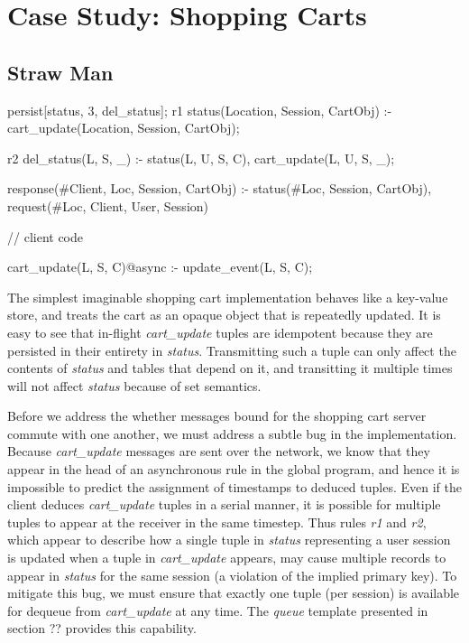\section{Case Study: Shopping Carts}


\subsection{Straw Man}

\begin{Dedalus}
persist[status, 3, del_status];
r1
status(Location, Session, CartObj) :-
    cart_update(Location,  Session, CartObj);
    
r2
del_status(L, S, _) :-
    status(L, U, S, C),
    cart_update(L, U, S, _);

response(#Client, Loc, Session, CartObj) :-
    status(#Loc, Session, CartObj),
    request(#Loc, Client, User, Session)

// client code

cart_update(L, S, C)@async :- update_event(L, S, C);

\end{Dedalus}

The simplest imaginable shopping cart implementation behaves like a key-value store,
and treats the cart as an opaque object that is repeatedly updated.  It is easy to see that
in-flight {\em cart\_update} tuples are idempotent because they are persisted in their entirety
in {\em status}.  Transmitting such a tuple can only affect the contents of {\em status} and tables that depend on it, and transitting it multiple times will not affect {\em status} because of set
semantics.

Before we address the whether messages bound for the shopping cart server commute 
with one another, we must address a subtle bug in the implementation.  Because {\em cart\_update}
messages are sent over the network, we know that they appear in the head of an asynchronous 
rule in the global program, and hence it is impossible to predict the assignment of timestamps
to deduced tuples.  Even if the client deduces {\em cart\_update} tuples in a serial manner, it
is possible for multiple tuples to appear at the receiver in the same timestep.  Thus rules {\em r1} 
and {\em r2}, which appear to describe how a single tuple in {\em status} representing a user
session is updated when a tuple in {\em cart\_update} appears, may cause multiple records
to appear in {\em status} for the same session (a violation of the implied primary key).
To mitigate this bug, we must ensure that exactly one tuple (per session) is available for dequeue
from {\em cart\_update} at any time.  The \emph{queue} template presented in section ?? 
provides this capability.

